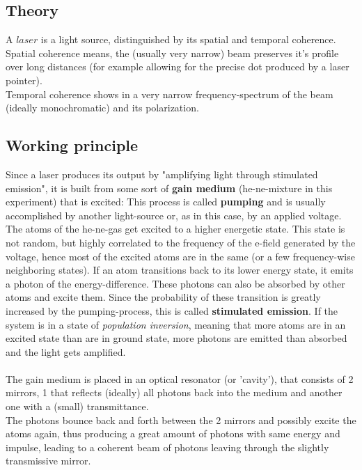 \documentclass[12pt,a4paper]{article}
\begin{document}
\begin{multicols}{2}
\section{Theory}
A $laser$ is a light source, distinguished by its spatial and temporal coherence.\\
Spatial coherence means, the (usually very narrow) beam preserves it's profile over long distances (for example allowing for the precise dot produced by a laser pointer).\\
Temporal coherence shows in a very narrow frequency-spectrum of the beam (ideally monochromatic) and its polarization.\\

\subsection{Working principle}
\noindent Since a laser produces its output by "amplifying light through stimulated emission", it is built from some sort of \textbf{gain medium} (he-ne-mixture in this experiment) that is excited: This process is called \textbf{pumping} and is usually accomplished by another light-source or, as in this case, by an applied voltage.\\
The atoms of the he-ne-gas get excited to a higher energetic state. This state is not random, but highly correlated to the frequency of the e-field generated by the voltage, hence most of the excited atoms are in the same (or a few frequency-wise neighboring states). If an atom transitions back to its lower energy state, it emits a photon of the energy-difference. These photons can also be absorbed by other atoms and excite them. Since the probability of these transition is greatly increased by the pumping-process, this is called \textbf{stimulated emission}.
If the system is in a state of \textit{population inversion}, meaning that more atoms are in an excited state than are in ground state, more photons are emitted than absorbed and the light gets amplified.\\
\\
The gain medium is placed in an optical resonator (or 'cavity'), that consists of 2 mirrors, 1 that reflects (ideally) all photons back into the medium and another one with a (small) transmittance.\\
The photons bounce back and forth between the 2 mirrors and possibly excite the atoms again, thus producing a great amount of photons with same energy and impulse, leading to a coherent beam of photons leaving through the slightly transmissive mirror.\\


\end{multicols}
\end{document}
